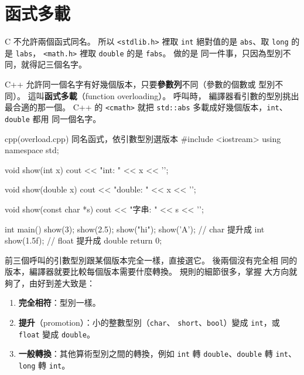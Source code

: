 \section{函式多載}
\label{sec:overloading}

\begin{crecap}
C 不允許兩個函式同名。 所以 \texttt{<stdlib.h>} 裡取 \texttt{int}
絕對值的是 \texttt{abs}、取 \texttt{long} 的是 \texttt{labs}，
\texttt{<math.h>} 裡取 \texttt{double} 的是 \texttt{fabs}。 做的是
同一件事，只因為型別不同，就得記三個名字。
\end{crecap}

C++ 允許同一個名字有好幾個版本，只要\textbf{參數列}不同（參數的個數或
型別不同）。 這叫\textbf{函式多載}（function overloading）。 呼叫時，
編譯器看引數的型別挑出最合適的那一個。 C++ 的 \texttt{<cmath>} 就把
\texttt{std::abs} 多載成好幾個版本，\texttt{int}、\texttt{double} 都用
同一個名字。

\begin{example}[label=ex:overload]{cpp}{(overload.cpp) 同名函式，依引數型別選版本}
#include <iostream>
using namespace std;

void show(int x) {
    cout << "int: " << x << '\n';
}

void show(double x) {
    cout << "double: " << x << '\n';
}

void show(const char *s) {
    cout << "字串: " << s << '\n';
}

int main() {
    show(3);
    show(2.5);
    show("hi");
    show('A');     // char 提升成 int
    show(1.5f);    // float 提升成 double
    return 0;
}
\end{example}


前三個呼叫的引數型別跟某個版本完全一樣，直接選它。 後兩個沒有完全相
同的版本，編譯器就要比較每個版本需要什麼轉換。 規則的細節很多，掌握
大方向就夠了，由好到差大致是：

\begin{enumerate}
\item \textbf{完全相符}：型別一樣。
\item \textbf{提升}（promotion）：小的整數型別（\texttt{char}、
\texttt{short}、\texttt{bool}）變成 \texttt{int}，或 \texttt{float}
變成 \texttt{double}。
\item \textbf{一般轉換}：其他算術型別之間的轉換，例如 \texttt{int} 轉
\texttt{double}、\texttt{double} 轉 \texttt{int}、\texttt{long} 轉
\texttt{int}。
\end{enumerate}


